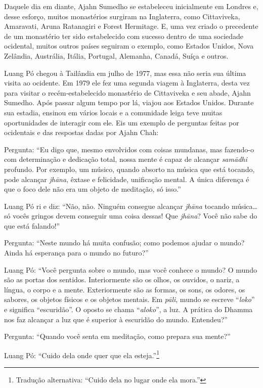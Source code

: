 Daquele dia em diante, Ajahn Sumedho se estabeleceu inicialmente em
Londres e, desse esforço, muitos monastérios surgiram na Inglaterra,
como Cittaviveka, Amaravati, Aruna Ratanagiri e Forest Hermitage. E, uma
vez criado o precedente de um monastério ter sido estabelecido com
sucesso dentro de uma sociedade ocidental, muitos outros países seguiram
o exemplo, como Estados Unidos, Nova Zelândia, Austrália, Itália,
Portugal, Alemanha, Canadá, Suíça e outros.

Luang Pó chegou à Tailândia em julho de 1977, mas essa não seria sua
última visita ao ocidente. Em 1979 ele fez uma segunda viagem à
\mbox{Inglaterra}, desta vez para visitar o recém-estabelecido monastério de
Cittaviveka e seu abade, Ajahn Sumedho. Após passar algum tempo por lá,
viajou aos Estados Unidos. Durante sua estadia, ensinou em vários locais
e a comunidade leiga teve muitas oportunidades de interagir com ele. Eis
um exemplo de perguntas feitas por ocidentais e das respostas dadas por
Ajahn Chah:

Pergunta: ``Eu digo que, mesmo envolvidos com coisas mundanas, mas
fazendo-o com determinação e dedicação total, nossa mente é capaz de
alcançar \emph{samādhi} profundo. Por exemplo, um músico, quando absorto
na música que está tocando, pode alcançar \emph{jhāna}, êxtase e
felicidade, unificação mental. A única diferença é que o foco dele não
era um objeto de meditação, só isso.''

Luang Pó ri e diz: ``Não, não. Ninguém consegue alcançar \emph{jhāna}
tocando música\ldots{} só vocês gringos devem conseguir uma coisa
dessas! Que \emph{jhāna}? Você não sabe do que está falando!''

Pergunta: ``Neste mundo há muita confusão; como podemos ajudar o mundo?
Ainda há esperança para o mundo no futuro?''

Luang Pó: ``Você pergunta sobre o mundo, mas você conhece o mundo? O
mundo são as portas dos sentidos. Interiormente são os olhos, os
ouvidos, o nariz, a língua, o corpo e a mente. Exteriormente são as
formas, os sons, os odores, os sabores, os objetos físicos e os objetos
mentais. Em \emph{pāli}, mundo se escreve ``\emph{loko}'' e significa
``escuridão''. O oposto se chama ``\emph{aloko}'', a luz. A prática do
Dhamma nos faz alcançar a luz que é superior à escuridão do mundo.
Entendeu?''

Pergunta: ``Quando você senta em meditação, como prepara sua mente?''

Luang Pó: ``Cuido dela onde quer que ela esteja.''\footnote{Tradução
  alternativa: ``Cuido dela no lugar onde ela mora.''}

